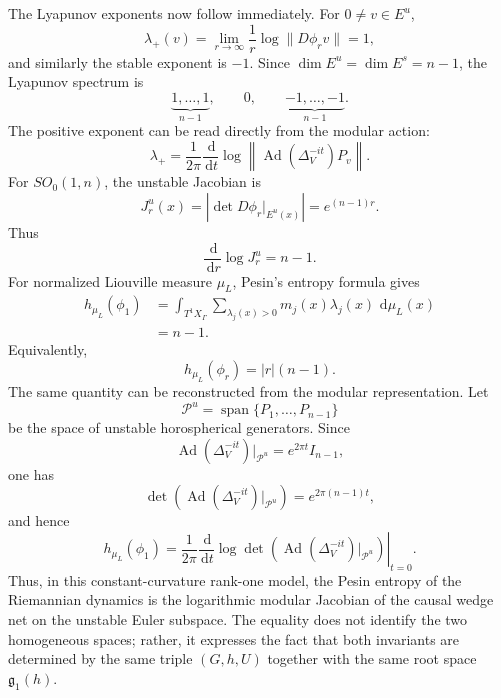 \documentclass[11pt]{article}
\theoremstyle{definition}
\newcommand{\dd}{\,\mathrm{d}}
\newcommand{\nn}{\nonumber}
\newcommand{\Ad}{\operatorname{Ad}}
\begin{document}
The Lyapunov exponents now follow immediately.  For \(0\neq v\in E^u\),
\begin{equation}
\lambda_+(v)
=
\lim_{r\to\infty}
\frac{1}{r}
\log\|D\phi_rv\|
=
1,
\end{equation}
and similarly the stable exponent is \(-1\).  Since
\(\dim E^u=\dim E^s=n-1\), the Lyapunov spectrum is
\begin{equation}
\underbrace{1,\ldots,1}_{n-1},
\qquad 0,\qquad
\underbrace{-1,\ldots,-1}_{n-1}.
\label{eq:lyapunov-spectrum}
\end{equation}
The positive exponent can be read directly from the modular action:
\begin{equation}
\lambda_+
=
\frac{1}{2\pi}
\frac{\dd}{\dd t}
\log
\left\|
\Ad(\Delta_V^{-it})P_v
\right\|.
\label{eq:modular-lyapunov}
\end{equation}
For \(SO_0(1,n)\), the unstable Jacobian is
\begin{equation}
J_r^u(x)
=
\left|
\det D\phi_r|_{E^u(x)}
\right|
=
e^{(n-1)r}.
\label{eq:unstable-jacobian}
\end{equation}
Thus
\[
\frac{\dd}{\dd r}\log J_r^u=n-1.
\]
For normalized Liouville measure \(\mu_L\), Pesin's entropy formula gives
\begin{align}
h_{\mu_L}(\phi_1)
&=
\int_{T^1X_\Gamma}
\sum_{\lambda_j(x)>0}m_j(x)\lambda_j(x)\,
\dd\mu_L(x)
\nn\\
&=
n-1.
\label{eq:pesin}
\end{align}
Equivalently,
\[
h_{\mu_L}(\phi_r)=|r|(n-1).
\]
The same quantity can be reconstructed from the modular representation.  Let
\[
\mathcal P^u
=
\operatorname{span}\{P_1,\ldots,P_{n-1}\}
\]
be the space of unstable horospherical generators.  Since
\[
\Ad(\Delta_V^{-it})|_{\mathcal P^u}
=
e^{2\pi t}I_{n-1},
\]
one has
\[
\det\left(
\Ad(\Delta_V^{-it})|_{\mathcal P^u}
\right)
=
e^{2\pi(n-1)t},
\]
and hence
\begin{equation}
h_{\mu_L}(\phi_1)
=
\frac{1}{2\pi}
\left.
\frac{\dd}{\dd t}
\log
\det\left(
\Ad(\Delta_V^{-it})|_{\mathcal P^u}
\right)
\right|_{t=0}.
\label{eq:modular-entropy}
\end{equation}
Thus, in this constant-curvature rank-one model, the Pesin entropy of the Riemannian
dynamics is the logarithmic modular Jacobian of the causal wedge net on the unstable
Euler subspace.  The equality does not identify the two homogeneous spaces; rather, it
expresses the fact that both invariants are determined by the same triple \((G,h,U)\)
together with the same root space \(\mathfrak g_1(h)\).
\end{document}
